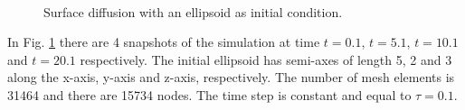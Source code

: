 \documentclass[a4paper,11pt, onecolumn]{article}
\begin{document}
\begin{figure}[htbp]
  \centering
  \quad
  \\
  \quad
  \caption{Surface diffusion with an ellipsoid as initial condition.}
  \label{fig:sd_ellipsoid}
\end{figure}

\noindent In Fig. \ref{fig:sd_ellipsoid} there are 4 snapshots of the simulation at time $t=0.1$, $t=5.1$, $t=10.1$ and $t=20.1$ respectively. The initial ellipsoid has semi-axes of length 5, 2 and 3 along the x-axis, y-axis and z-axis, respectively. The number of mesh elements is 31464 and there are 15734 nodes. The time step is constant and equal to $\tau=0.1$.
\newline
\end{document}
